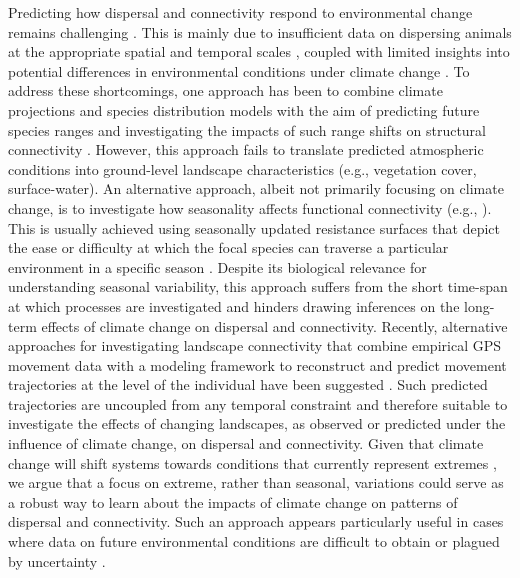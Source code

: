 \documentclass[abstract=on,10pt,a4paper,bibliography=totocnumbered]{article}
\begin{document}
Predicting how dispersal and connectivity respond to environmental change
remains challenging \citep{Littlefield.2019}. This is mainly due to insufficient
data on dispersing animals at the appropriate spatial and temporal scales
\citep{Graves.2014, Vasudev.2015}, coupled with limited insights into potential
differences in environmental conditions under climate change
\citep{Scheiter.2009, IPCC.2022}. To address these shortcomings, one approach
has been to combine climate projections and species distribution models with the
aim of predicting future species ranges and investigating the impacts of such
range shifts on structural connectivity \citep{Wasserman.2012, Ashrafzadeh.2019,
Luo.2021}. However, this approach fails to translate predicted atmospheric
conditions into ground-level landscape characteristics (e.g., vegetation cover,
surface-water). An alternative approach, albeit not primarily focusing on
climate change, is to investigate how seasonality affects functional
connectivity (e.g., \citealp{Mui.2017, Osipova.2019, Zeller.2020, Kaszta.2021}).
This is usually achieved using seasonally updated resistance surfaces that
depict the ease or difficulty at which the focal species can traverse a
particular environment in a specific season \citep{Zeller.2012}. Despite its
biological relevance for understanding seasonal variability, this approach
suffers from the short time-span at which processes are investigated and hinders
drawing inferences on the long-term effects of climate change on dispersal and
connectivity. Recently, alternative approaches for investigating landscape
connectivity that combine empirical GPS movement data with a modeling framework
to reconstruct and predict movement trajectories at the level of the individual
have been suggested \citep{Signer.2017, Hofmann.2023, Signer.2023}. Such
predicted trajectories are uncoupled from any temporal constraint and therefore
suitable to investigate the effects of changing landscapes, as observed or
predicted under the influence of climate change, on dispersal and connectivity.
Given that climate change will shift systems towards conditions that currently
represent extremes \citep{Stott.2016, Ummenhofer.2017, IPCC.2022}, we argue that
a focus on extreme, rather than seasonal, variations could serve as a robust way
to learn about the impacts of climate change on patterns of dispersal and
connectivity. Such an approach appears particularly useful in cases where data
on future environmental conditions are difficult to obtain or plagued by
uncertainty \citep{Collins.2012}.
\end{document}
